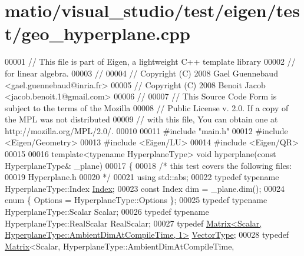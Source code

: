 \hypertarget{matio_2visual__studio_2test_2eigen_2test_2geo__hyperplane_8cpp_source}{}\section{matio/visual\+\_\+studio/test/eigen/test/geo\+\_\+hyperplane.cpp}
\label{matio_2visual__studio_2test_2eigen_2test_2geo__hyperplane_8cpp_source}

\begin{DoxyCode}
00001 \textcolor{comment}{// This file is part of Eigen, a lightweight C++ template library}
00002 \textcolor{comment}{// for linear algebra.}
00003 \textcolor{comment}{//}
00004 \textcolor{comment}{// Copyright (C) 2008 Gael Guennebaud <gael.guennebaud@inria.fr>}
00005 \textcolor{comment}{// Copyright (C) 2008 Benoit Jacob <jacob.benoit.1@gmail.com>}
00006 \textcolor{comment}{//}
00007 \textcolor{comment}{// This Source Code Form is subject to the terms of the Mozilla}
00008 \textcolor{comment}{// Public License v. 2.0. If a copy of the MPL was not distributed}
00009 \textcolor{comment}{// with this file, You can obtain one at http://mozilla.org/MPL/2.0/.}
00010 
00011 \textcolor{preprocessor}{#include "main.h"}
00012 \textcolor{preprocessor}{#include <Eigen/Geometry>}
00013 \textcolor{preprocessor}{#include <Eigen/LU>}
00014 \textcolor{preprocessor}{#include <Eigen/QR>}
00015 
00016 \textcolor{keyword}{template}<\textcolor{keyword}{typename} HyperplaneType> \textcolor{keywordtype}{void} hyperplane(\textcolor{keyword}{const} HyperplaneType& \_plane)
00017 \{
00018   \textcolor{comment}{/* this test covers the following files:}
00019 \textcolor{comment}{     Hyperplane.h}
00020 \textcolor{comment}{  */}
00021   \textcolor{keyword}{using} std::abs;
00022   \textcolor{keyword}{typedef} \textcolor{keyword}{typename} HyperplaneType::Index \hyperlink{namespace_eigen_a62e77e0933482dafde8fe197d9a2cfde}{Index};
00023   \textcolor{keyword}{const} Index dim = \_plane.dim();
00024   \textcolor{keyword}{enum} \{ Options = HyperplaneType::Options \};
00025   \textcolor{keyword}{typedef} \textcolor{keyword}{typename} HyperplaneType::Scalar Scalar;
00026   \textcolor{keyword}{typedef} \textcolor{keyword}{typename} HyperplaneType::RealScalar RealScalar;
00027   \textcolor{keyword}{typedef} \hyperlink{group___core___module_class_eigen_1_1_matrix}{Matrix<Scalar, HyperplaneType::AmbientDimAtCompileTime, 1>}
       \hyperlink{struct_vector_type}{VectorType};
00028   \textcolor{keyword}{typedef} \hyperlink{group___core___module_class_eigen_1_1_matrix}{Matrix}<Scalar, HyperplaneType::AmbientDimAtCompileTime,

\end{DoxyCode}
